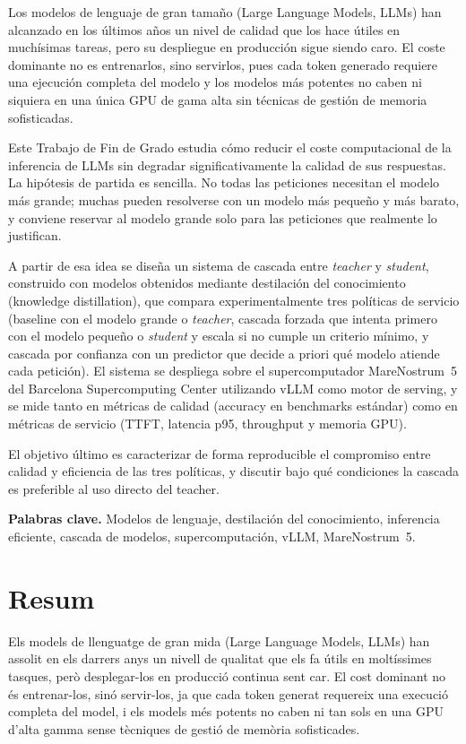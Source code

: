 Los modelos de lenguaje de gran tamaño (Large Language Models, LLMs) han alcanzado en los últimos años un nivel de calidad que los hace útiles en muchísimas tareas, pero su despliegue en producción sigue siendo caro. El coste dominante no es entrenarlos, sino servirlos, pues cada token generado requiere una ejecución completa del modelo y los modelos más potentes no caben ni siquiera en una única GPU de gama alta sin técnicas de gestión de memoria sofisticadas.

Este Trabajo de Fin de Grado estudia cómo reducir el coste computacional de la inferencia de LLMs sin degradar significativamente la calidad de sus respuestas. La hipótesis de partida es sencilla. No todas las peticiones necesitan el modelo más grande; muchas pueden resolverse con un modelo más pequeño y más barato, y conviene reservar al modelo grande solo para las peticiones que realmente lo justifican.

A partir de esa idea se diseña un sistema de cascada entre \textit{teacher} y \textit{student}, construido con modelos obtenidos mediante destilación del conocimiento (knowledge distillation), que compara experimentalmente tres políticas de servicio (baseline con el modelo grande o \textit{teacher}, cascada forzada que intenta primero con el modelo pequeño o \textit{student} y escala si no cumple un criterio mínimo, y cascada por confianza con un predictor que decide a priori qué modelo atiende cada petición). El sistema se despliega sobre el supercomputador MareNostrum~5 del Barcelona Supercomputing Center utilizando vLLM como motor de serving, y se mide tanto en métricas de calidad (accuracy en benchmarks estándar) como en métricas de servicio (TTFT, latencia p95, throughput y memoria GPU).

El objetivo último es caracterizar de forma reproducible el compromiso entre calidad y eficiencia de las tres políticas, y discutir bajo qué condiciones la cascada es preferible al uso directo del teacher.

\textbf{Palabras clave.} Modelos de lenguaje, destilación del conocimiento, inferencia eficiente, cascada de modelos, supercomputación, vLLM, MareNostrum~5.

\newpage
\section*{Resum}

Els models de llenguatge de gran mida (Large Language Models, LLMs) han assolit en els darrers anys un nivell de qualitat que els fa útils en moltíssimes tasques, però desplegar-los en producció continua sent car. El cost dominant no és entrenar-los, sinó servir-los, ja que cada token generat requereix una execució completa del model, i els models més potents no caben ni tan sols en una GPU d'alta gamma sense tècniques de gestió de memòria sofisticades.

